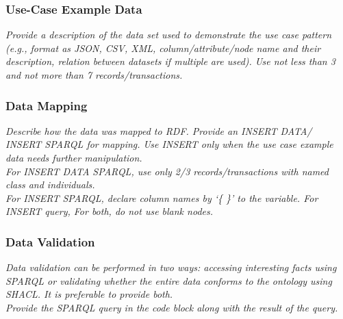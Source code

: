 \subsubsection*{Use-Case Example Data}
 \textit{ 
Provide a description of the data set used to demonstrate the use case pattern (e.g., format as JSON, CSV, XML, column/attribute/node name and their description, relation between datasets if multiple are used). Use not less than 3 and not more than 7 records/transactions.
  }

\subsubsection*{Data Mapping}
 \textit{ 
Describe how the data was mapped to RDF. Provide an INSERT DATA/ INSERT SPARQL for mapping. Use INSERT only when the use case example data needs further manipulation. \\
For INSERT DATA SPARQL, use only 2/3 records/transactions with named class and individuals. \\
For INSERT SPARQL, declare column names by `\{ \}' to the variable.  
For INSERT query, 
For both, do not use blank nodes.    
  }

\subsubsection*{Data Validation}
 \textit{ 
Data validation can be performed in two ways: accessing interesting facts using SPARQL or validating whether the entire data conforms to the ontology using SHACL. It is preferable to provide both. \\
Provide the SPARQL query in the code block along with the result of the query. \\
  }